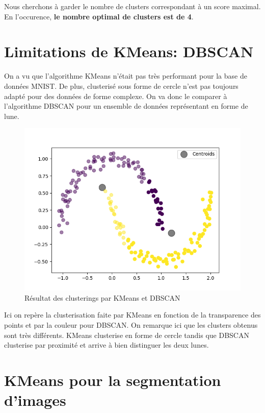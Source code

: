 \documentclass[french,a4paper,18pt]{article}
\begin{document}
Nous cherchons à garder le nombre de clusters correspondant à un score maximal. En l'occurence, \textbf{le nombre optimal de clusters est de 4}.

\section{Limitations de KMeans: DBSCAN}

On a vu que l'algorithme KMeans n'était pas très performant pour la base de données MNIST.
De plus, clusterisé sous forme de cercle n'est pas toujours adapté pour des données de forme complexe.
On va donc le comparer à l'algorithme DBSCAN pour un ensemble de données représentant en forme de lune.

\begin{figure}[h!]
    \centering
    \includegraphics[scale=0.5]{../images/moon_dbscan.png}
    \caption{Résultat des clusterings par KMeans et DBSCAN}\label{fig:dbscan_moon}
\end{figure}

Ici on repère la clusterisation faite par KMeans en fonction de la transparence des points et par la couleur pour DBSCAN. 
On remarque ici que les clusters obtenus sont très différents. 
KMeans clusterise en forme de cercle tandis que DBSCAN clusterise par proximité et arrive à bien distinguer les deux lunes.

\section{KMeans pour la segmentation d'images}
\end{document}
